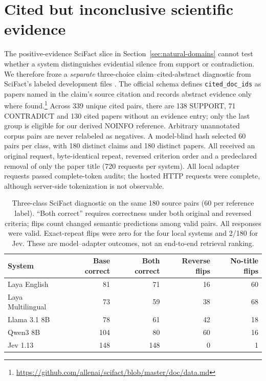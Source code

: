 \section{Cited but inconclusive scientific evidence}
\label{sec:scifact3}
The positive-evidence SciFact slice in Section~\ref{sec:natural-domains} cannot test whether a system distinguishes evidential silence from support or contradiction. We therefore froze a \emph{separate} three-choice claim--cited-abstract diagnostic from SciFact's labeled development files \citep{scifact}. The official schema defines \texttt{cited\_doc\_ids} as papers named in the claim's source citation and records abstract evidence only where found.\footnote{\url{https://github.com/allenai/scifact/blob/master/doc/data.md}} Across 339 unique cited pairs, there are 138 SUPPORT, 71 CONTRADICT and 130 cited papers without an evidence entry; only the last group is eligible for our derived NOINFO reference. Arbitrary unannotated corpus pairs are never relabeled as negatives. A model-blind hash selected 60 pairs per class, with 180 distinct claims and 180 distinct papers. All received an original request, byte-identical repeat, reversed criterion order and a predeclared removal of only the paper title (720 requests per system). All local adapter requests passed complete-token audits; the hosted HTTP requests were complete, although server-side tokenization is not observable.

\begin{table}[!t]
\centering\small
\setlength{\tabcolsep}{5pt}
\begin{tabular}{lrrrr}
\toprule
System & Base correct & Both correct & Reverse flips & No-title flips \\
\midrule
Laya English & 81 & 71 & 16 & 60 \\
Laya Multilingual & 73 & 59 & 38 & 68 \\
Llama 3.1 8B & 78 & 61 & 42 & 18 \\
Qwen3 8B & 104 & 80 & 60 & 16 \\
Jev 1.13 & 148 & 148 & 0 & 1 \\
\bottomrule
\end{tabular}
\caption{Three-class SciFact diagnostic on the same 180 source pairs (60 per reference label). ``Both correct'' requires correctness under both original and reversed criteria; flips count changed semantic predictions among valid pairs. All responses were valid. Exact-repeat flips were zero for the four local systems and 2/180 for Jev. These are model--adapter outcomes, not an end-to-end retrieval ranking.}
\label{tab:scifact3}
\end{table}

